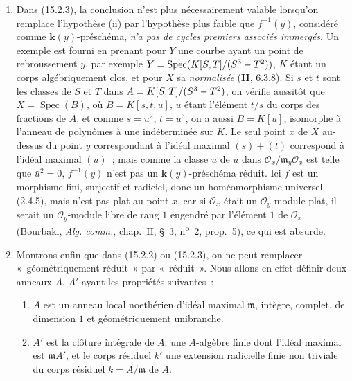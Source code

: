 \begin{remarks}[15.2.4]
\begin{enumerate}[label=(\roman*)]
  \item Dans (15.2.3), la conclusion n'est plus nécessairement valable lorsqu'on
  remplace l'hypothèse (ii) par l'hypothèse plus faible que $f^{-1}(y)$,
  considéré comme $\boldsymbol{k}(y)$-préschéma, \emph{n'a pas de cycles premiers associés
  immergés}. Un exemple est fourni en prenant pour $Y$ une courbe ayant un point
  de rebroussement $y$, par exemple
  $Y=\operatorname{Spec}(K[S,T]/(S^3- T^2))$, $K$ étant un corps algébriquement
  clos, et pour $X$ sa \emph{normalisée} (\textbf{II}, 6.3.8). Si $s$ et $t$ sont les
  classes de $S$ et $T$ dans $A=K[S,T]/(S^3- T^2)$, on vérifie aussitôt que
  $X=\operatorname{Spec}(B)$, où $B=K[s,t,u]$, $u$ étant l'élément $t/s$ du corps
  des fractions de $A$, et comme $s=u^2$, $t=u^3$, on a aussi $B=K[u]$,
  isomorphe à l'anneau de polynômes à une indéterminée sur $K$. Le seul point $x$
  de $X$ au-dessus du point $y$ correspondant à l'idéal maximal $(s)+(t)$
  correspond à l'idéal maximal $(u)$~; mais comme la classe $\bar u$ de $u$ dans
  $\mathcal O_x/\mathfrak m_y\mathcal O_x$ est telle que $\bar u^2=0$,
  $f^{-1}(y)$ n'est pas un $\boldsymbol{k}(y)$-préschéma réduit. Ici $f$ est un
  morphisme fini, surjectif et radiciel, donc un homéomorphisme universel (2.4.5),
  mais n'est pas plat au point $x$, car si $\mathcal O_x$ était un
  $\mathcal O_y$-module plat, il serait un $\mathcal O_y$-module
  libre de rang $1$ engendré par l'élément $1$ de $\mathcal O_x$ (Bourbaki,
  \emph{Alg. comm.}, chap.~II, \S~3, n\textsuperscript{o}~2, prop.~5), ce qui est
  absurde.

  \item Montrons enfin que dans (15.2.2) ou (15.2.3), on ne peut remplacer
  «~géométriquement réduit~» par «~réduit~». Nous allons en effet définir deux
  anneaux $A$, $A'$ ayant les propriétés suivantes~:
  \begin{enumerate}[label=\arabic*)]
    \item $A$ est un anneau local noethérien d'idéal maximal $\mathfrak m$,
    intègre, complet, de dimension $1$ et géométriquement unibranche.
    \item $A'$ est la clôture intégrale de $A$, une $A$-algèbre finie dont
    l'idéal maximal est $\mathfrak mA'$, et le corps résiduel $k'$ une extension
    radicielle finie non triviale du corps résiduel $k=A/\mathfrak m$ de $A$.
  \end{enumerate}


\end{enumerate}
\end{remarks}

